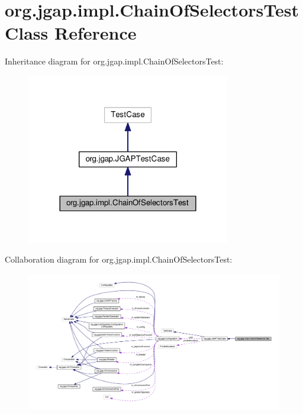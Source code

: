 \hypertarget{classorg_1_1jgap_1_1impl_1_1_chain_of_selectors_test}{\section{org.\-jgap.\-impl.\-Chain\-Of\-Selectors\-Test Class Reference}
\label{classorg_1_1jgap_1_1impl_1_1_chain_of_selectors_test}
}


Inheritance diagram for org.\-jgap.\-impl.\-Chain\-Of\-Selectors\-Test\-:
\nopagebreak
\begin{figure}[H]
\begin{center}
\leavevmode
\includegraphics[width=252pt]{classorg_1_1jgap_1_1impl_1_1_chain_of_selectors_test__inherit__graph}
\end{center}
\end{figure}


Collaboration diagram for org.\-jgap.\-impl.\-Chain\-Of\-Selectors\-Test\-:
\nopagebreak
\begin{figure}[H]
\begin{center}
\leavevmode
\includegraphics[width=350pt]{classorg_1_1jgap_1_1impl_1_1_chain_of_selectors_test__coll__graph}
\end{center}
\end{figure}
